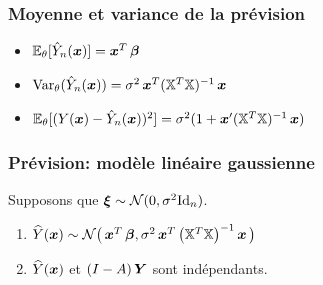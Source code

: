 \begin{frame}
\frametitle{Moyenne et variance de la prévision}
\begin{theorem}
\begin{itemize}
\item \alert<1>{$\PE_{\truetheta}[\hat{Y}_n(\bx)]= \bx^T \truebeta$}
\item \alert<2>{$\Var_{\truetheta}(\hat{Y}_n(\bx))= \sigma^2 \bx^T (\regressmat^T \regressmat)^{-1} \bx$}
\item \alert<3>{$\PE_{\truetheta}[ (Y(\bx) - \hat{Y}_n(\bx))^2]= \sigma^2 (1 + \bx' (\regressmat^T \regressmat)^{-1} \bx)$}
\end{itemize}
\end{theorem}
\end{frame}


\begin{frame}
\frametitle{Prévision: modèle linéaire gaussienne}
\begin{prop}
Supposons que $\bnoise \sim {\mathcal N}(0,\sigma^2\mathrm{Id}_n)$.
\begin{enumerate}
\item $\widehat{Y}(\bx) \sim {\mathcal N}\big(\bx ^T\truebeta, \sigma^2 \bx^T \big(\regressmat^T\regressmat\big)^{-1} \bx \big)$
\item $\widehat{Y}(\bx)$ et $(I - \projX) \bY$ sont
indépendants.
\end{enumerate}
\end{prop}
\end{frame}

